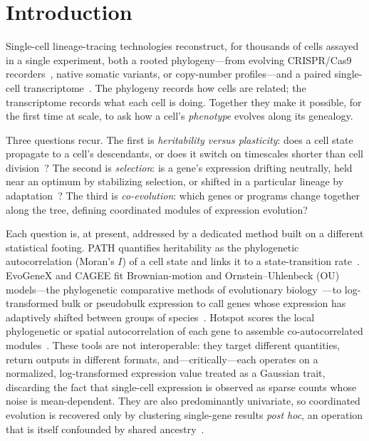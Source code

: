 \documentclass{article}
\begin{document}
\section*{Introduction}
\label{sec:introduction}

Single-cell lineage-tracing technologies reconstruct, for thousands of cells assayed in
a single experiment, both a rooted phylogeny---from evolving CRISPR/Cas9
recorders~\cite{mckenna_gestalt_2016, raj_scgestalt_2018}, native somatic variants, or
copy-number profiles---and a paired single-cell transcriptome~\cite{wagner_lineage_2020}.
The phylogeny records how cells are related; the transcriptome records what each cell is
doing. Together they make it possible, for the first time at scale, to ask how a cell's
\emph{phenotype} evolves along its genealogy.

Three questions recur. The first is \emph{heritability versus plasticity}: does a cell
state propagate to a cell's descendants, or does it switch on timescales shorter than
cell division~\cite{schiffman_path_2024}? The second is \emph{selection}: is a gene's
expression drifting neutrally, held near an optimum by stabilizing selection, or shifted
in a particular lineage by adaptation~\cite{hirsch_emt_2025}? The third is
\emph{co-evolution}: which genes or programs change together along the tree, defining
coordinated modules of expression evolution?

Each question is, at present, addressed by a dedicated method built on a different
statistical footing. PATH quantifies heritability as the phylogenetic autocorrelation
(Moran's $I$) of a cell state and links it to a state-transition
rate~\cite{schiffman_path_2024, moran_autocorrelation_1950}. EvoGeneX and CAGEE fit
Brownian-motion and Ornstein--Uhlenbeck (OU) models---the phylogenetic comparative
methods of evolutionary biology~\cite{felsenstein_contrasts_1985, hansen_ou_1997,
butler_king_2004}---to log-transformed bulk or pseudobulk expression to call genes whose
expression has adaptively shifted between groups of
species~\cite{mendes_cagee_2023, rohlfs_eve_2015}. Hotspot scores the local phylogenetic
or spatial autocorrelation of each gene to assemble co-autocorrelated
modules~\cite{detomaso_hotspot_2021}. These tools are not interoperable: they target
different quantities, return outputs in different formats, and---critically---each
operates on a normalized, log-transformed expression value treated as a Gaussian trait,
discarding the fact that single-cell expression is observed as sparse counts whose noise
is mean-dependent. They are also predominantly univariate, so coordinated evolution is
recovered only by clustering single-gene results \emph{post hoc}, an operation that is
itself confounded by shared ancestry~\cite{felsenstein_contrasts_1985}.
\end{document}
